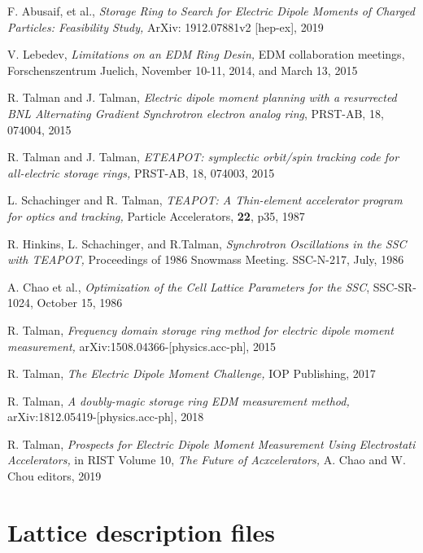 \documentclass[]{article}
\begin{document}
\begin{thebibliography}{99}
F. Abusaif, et al., \emph{Storage Ring to Search for Electric Dipole Moments 
of Charged Particles: Feasibility Study,} 
ArXiv: 1912.07881v2 [hep-ex], 2019

V. Lebedev, \emph{Limitations on an EDM Ring Desin,} EDM collaboration meetings, 
Forschenszentrum Juelich, November 10-11, 2014, and March 13, 2015

R. Talman and J. Talman, \emph{Electric dipole moment planning with a resurrected 
BNL Alternating Gradient Synchrotron electron analog ring}, PRST-AB, 18, 
074004, 2015

R. Talman and J. Talman, \emph{ETEAPOT: symplectic orbit/spin tracking code for 
all-electric storage rings,} PRST-AB, 18, 074003, 2015

L. Schachinger and R. Talman, \emph{TEAPOT: A Thin-element accelerator program
for optics and tracking,} Particle Accelerators, {\bf 22}, p35, 1987

R. Hinkins, L. Schachinger, and R.Talman, \emph{Synchrotron Oscillations in the SSC with TEAPOT,}
Proceedings of 1986 Snowmass Meeting. SSC-N-217, July, 1986
 
A. Chao et al., \emph{Optimization of the Cell Lattice Parameters for the SSC}, SSC-SR-1024, October 15, 1986

R. Talman, \emph{Frequency domain storage ring method for electric dipole moment 
measurement,} arXiv:1508.04366-[physics.acc-ph], 2015

R. Talman, \emph{The Electric Dipole Moment Challenge,} IOP Publishing, 2017

R. Talman, \emph{A doubly-magic storage ring EDM measurement  method,} 
arXiv:1812.05419-[physics.acc-ph], 2018

R. Talman, \emph{Prospects for Electric Dipole Moment Measurement Using Electrostati
Accelerators,} in RIST Volume 10, \emph{The Future of Acxcelerators, } A. Chao 
and W. Chou editors, 2019

\end{thebibliography}

\appendix
\section{Lattice description files}
\end{document}
